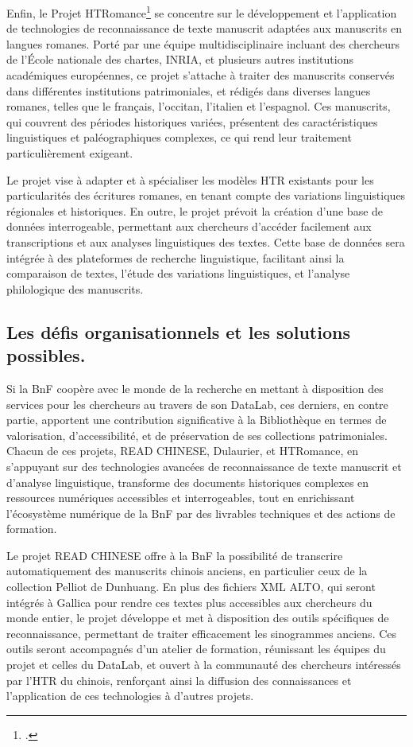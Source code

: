 \documentclass[a4paper,12pt,twoside]{book}
\begin{document}
	Enfin, le Projet HTRomance\footcite{clerice_htromance_2022} se concentre sur le développement et l’application de technologies de reconnaissance de texte manuscrit adaptées aux manuscrits en langues romanes. Porté par une équipe multidisciplinaire incluant des chercheurs de l’École nationale des chartes, INRIA, et plusieurs autres institutions académiques européennes, ce projet s’attache à traiter des manuscrits conservés dans différentes institutions patrimoniales, et rédigés dans diverses langues romanes, telles que le français, l’occitan, l’italien et l’espagnol. Ces manuscrits, qui couvrent des périodes historiques variées, présentent des caractéristiques linguistiques et paléographiques complexes, ce qui rend leur traitement particulièrement exigeant.
	
	Le projet vise à adapter et à spécialiser les modèles HTR existants pour les particularités des écritures romanes, en tenant compte des variations linguistiques régionales et historiques. En outre, le projet prévoit la création d’une base de données interrogeable, permettant aux chercheurs d’accéder facilement aux transcriptions et aux analyses linguistiques des textes. Cette base de données sera intégrée à des plateformes de recherche linguistique, facilitant ainsi la comparaison de textes, l’étude des variations linguistiques, et l’analyse philologique des manuscrits.
	\\
	
	\subsection{Les défis organisationnels et les solutions possibles.}
	
	Si la BnF coopère avec le monde de la recherche en mettant à disposition des services pour les chercheurs au travers de son DataLab, ces derniers, en contre partie, apportent une contribution significative à la Bibliothèque en termes de valorisation, d’accessibilité, et de préservation de ses collections patrimoniales. Chacun de ces projets, READ CHINESE, Dulaurier, et HTRomance, en s’appuyant sur des technologies avancées de reconnaissance de texte manuscrit et d’analyse linguistique, transforme des documents historiques complexes en ressources numériques accessibles et interrogeables, tout en enrichissant l’écosystème numérique de la BnF par des livrables techniques et des actions de formation.
	
	Le projet READ CHINESE offre à la BnF la possibilité de transcrire automatiquement des manuscrits chinois anciens, en particulier ceux de la collection Pelliot de Dunhuang. En plus des fichiers XML ALTO, qui seront intégrés à Gallica pour rendre ces textes plus accessibles aux chercheurs du monde entier, le projet développe et met à disposition des outils spécifiques de reconnaissance, permettant de traiter efficacement les sinogrammes anciens. Ces outils seront accompagnés d’un atelier de formation, réunissant les équipes du projet et celles du DataLab, et ouvert à la communauté des chercheurs intéressés par l’HTR du chinois, renforçant ainsi la diffusion des connaissances et l’application de ces technologies à d’autres projets.
	
\end{document}
